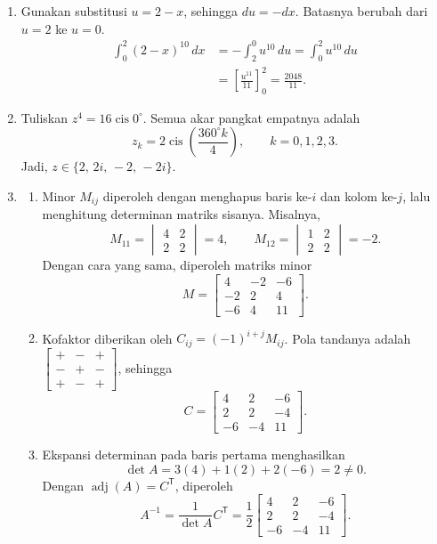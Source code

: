 \documentclass[11pt,a4paper]{article}
\begin{document}
\begin{enumerate}
    \item Gunakan substitusi $u=2-x$, sehingga $du=-dx$. Batasnya berubah dari $u=2$ ke $u=0$.
    \begin{align*}
        \int_0^2(2-x)^{10}\,dx
            &=-\int_2^0u^{10}\,du
            =\int_0^2u^{10}\,du\\
            &=\left[\frac{u^{11}}{11}\right]_0^2
            =\boxed{\frac{2048}{11}}.
    \end{align*}

    \item Tuliskan $z^4=16\operatorname{cis}0^\circ$. Semua akar pangkat empatnya adalah
    \[
        z_k=2\operatorname{cis}\left(\frac{360^\circ k}{4}\right),
        \qquad k=0,1,2,3.
    \]
    Jadi, $\boxed{z\in\{2,\,2i,\,-2,\,-2i\}}$.

    \newpage
    \item \begin{enumerate}
        \item Minor $M_{ij}$ diperoleh dengan menghapus baris ke-$i$ dan kolom ke-$j$, lalu menghitung determinan matriks sisanya. Misalnya,
        \[
            M_{11}=\begin{vmatrix}4&2\\2&2\end{vmatrix}=4,\qquad
            M_{12}=\begin{vmatrix}1&2\\2&2\end{vmatrix}=-2.
        \]
        Dengan cara yang sama, diperoleh matriks minor
        \[
            \boxed{M=\begin{bmatrix}4&-2&-6\\-2&2&4\\-6&4&11\end{bmatrix}}.
        \]
        \item Kofaktor diberikan oleh $C_{ij}=(-1)^{i+j}M_{ij}$. Pola tandanya adalah
        $\begin{bmatrix}+&-&+\\-&+&-\\+&-&+\end{bmatrix}$, sehingga
        \[
            \boxed{C=\begin{bmatrix}4&2&-6\\2&2&-4\\-6&-4&11\end{bmatrix}}.
        \]
        \item Ekspansi determinan pada baris pertama menghasilkan
        \[
            \det A=3(4)+1(2)+2(-6)=2\neq0.
        \]
        Dengan $\operatorname{adj}(A)=C^{\mathsf T}$, diperoleh
        \[
            \boxed{A^{-1}=\frac1{\det A}C^{\mathsf T}
                =\frac12\begin{bmatrix}4&2&-6\\2&2&-4\\-6&-4&11\end{bmatrix}}.
        \]
    \end{enumerate}
\end{enumerate}
\end{document}
